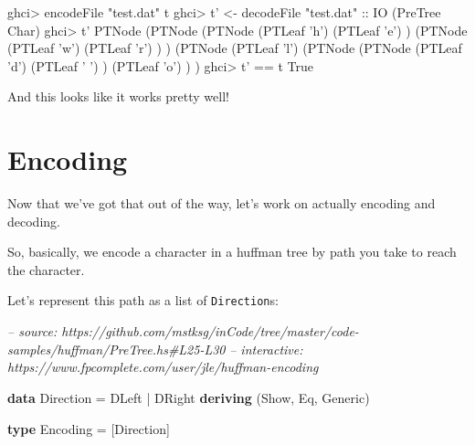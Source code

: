 \documentclass[]{article}
\newenvironment{Shaded}{}{}
\newcommand{\CharTok}[1]{\textcolor[rgb]{0.25,0.44,0.63}{#1}}
\newcommand{\CommentTok}[1]{\textcolor[rgb]{0.38,0.63,0.69}{\textit{#1}}}
\newcommand{\DataTypeTok}[1]{\textcolor[rgb]{0.56,0.13,0.00}{#1}}
\newcommand{\FunctionTok}[1]{\textcolor[rgb]{0.02,0.16,0.49}{#1}}
\newcommand{\KeywordTok}[1]{\textcolor[rgb]{0.00,0.44,0.13}{\textbf{#1}}}
\newcommand{\NormalTok}[1]{#1}
\newcommand{\OtherTok}[1]{\textcolor[rgb]{0.00,0.44,0.13}{#1}}
\newcommand{\StringTok}[1]{\textcolor[rgb]{0.25,0.44,0.63}{#1}}
\begin{document}
\begin{Shaded}
\begin{Highlighting}[]
\NormalTok{ghci}\FunctionTok{>}\NormalTok{ encodeFile }\StringTok{"test.dat"}\NormalTok{ t}
\NormalTok{ghci}\FunctionTok{>}\NormalTok{ t' }\OtherTok{<-}\NormalTok{ decodeFile }\StringTok{"test.dat"}\OtherTok{ ::} \DataTypeTok{IO}\NormalTok{ (}\DataTypeTok{PreTree} \DataTypeTok{Char}\NormalTok{)}
\NormalTok{ghci}\FunctionTok{>}\NormalTok{ t'}
\DataTypeTok{PTNode}\NormalTok{ (}\DataTypeTok{PTNode}\NormalTok{ (}\DataTypeTok{PTNode}\NormalTok{ (}\DataTypeTok{PTLeaf} \CharTok{'h'}\NormalTok{)}
\NormalTok{                       (}\DataTypeTok{PTLeaf} \CharTok{'e'}\NormalTok{)}
\NormalTok{               )}
\NormalTok{               (}\DataTypeTok{PTNode}\NormalTok{ (}\DataTypeTok{PTLeaf} \CharTok{'w'}\NormalTok{)}
\NormalTok{                       (}\DataTypeTok{PTLeaf} \CharTok{'r'}\NormalTok{)}
\NormalTok{               )}
\NormalTok{       )}
\NormalTok{       (}\DataTypeTok{PTNode}\NormalTok{ (}\DataTypeTok{PTLeaf} \CharTok{'l'}\NormalTok{)}
\NormalTok{               (}\DataTypeTok{PTNode}\NormalTok{ (}\DataTypeTok{PTNode}\NormalTok{ (}\DataTypeTok{PTLeaf} \CharTok{'d'}\NormalTok{)}
\NormalTok{                               (}\DataTypeTok{PTLeaf} \CharTok{' '}\NormalTok{)}
\NormalTok{                       )}
\NormalTok{                       (}\DataTypeTok{PTLeaf} \CharTok{'o'}\NormalTok{)}
\NormalTok{               )}
\NormalTok{       )}
\NormalTok{ghci}\FunctionTok{>}\NormalTok{ t' }\FunctionTok{==}\NormalTok{ t}
\DataTypeTok{True}
\end{Highlighting}
\end{Shaded}

And this looks like it works pretty well!

\hypertarget{encoding}{%
\section{Encoding}\label{encoding}}

Now that we've got that out of the way, let's work on actually encoding and
decoding.

So, basically, we encode a character in a huffman tree by path you take to reach
the character.

Let's represent this path as a list of \texttt{Direction}s:

\begin{Shaded}
\begin{Highlighting}[]
\CommentTok{-- source: https://github.com/mstksg/inCode/tree/master/code-samples/huffman/PreTree.hs#L25-L30}
\CommentTok{-- interactive: https://www.fpcomplete.com/user/jle/huffman-encoding}

\KeywordTok{data} \DataTypeTok{Direction} \FunctionTok{=} \DataTypeTok{DLeft}
               \FunctionTok{|} \DataTypeTok{DRight}
               \KeywordTok{deriving}\NormalTok{ (}\DataTypeTok{Show}\NormalTok{, }\DataTypeTok{Eq}\NormalTok{, }\DataTypeTok{Generic}\NormalTok{)}

\KeywordTok{type} \DataTypeTok{Encoding} \FunctionTok{=}\NormalTok{ [}\DataTypeTok{Direction}\NormalTok{]}
\end{Highlighting}
\end{Shaded}
\end{document}
